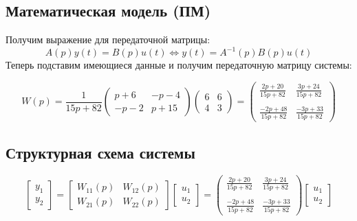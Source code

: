 \documentclass[a5paper, 10pt]{article}
\theoremstyle{definition}
\theoremstyle{plain}
\theoremstyle{remark}
\begin{document}
\subsection{Математическая модель (ПМ)}
Получим выражение для передаточной матрицы:
\begin{equation*}
A(p)y(t)=B(p)u(t) \Leftrightarrow y(t) = A^{-1}(p) B(p)u(t)
\end{equation*}
Теперь подставим имеющиеся данные и получим передаточную матрицу системы:

\begin{equation*}
W(p) = 
\frac{1}{15p+82}
\begin{pmatrix}
p+6 &-p-4\\
-p-2 & p+15
\end{pmatrix}
\begin{pmatrix}
6 &6\\
4 & 3
\end{pmatrix}
=
\begin{pmatrix}
\frac{2p+20}{15p+82} & \frac{3p+24}{15p+82}\\\\
\frac{-2p+48}{15p+82} & \frac{-3p+33}{15p+82}
\end{pmatrix}
\end{equation*}


\subsection{Структурная схема системы}
\begin{equation*}
\begin{bmatrix}
y_1\\
y_2
\end{bmatrix}
=
\begin{bmatrix}
W_{11}(p) & W_{12}(p)\\
W_{21}(p) & W_{22}(p)
\end{bmatrix}
\begin{bmatrix}
u_1\\
u_2
\end{bmatrix}
=
\begin{pmatrix}
\frac{2p+20}{15p+82} & \frac{3p+24}{15p+82}\\\\
\frac{-2p+48}{15p+82} & \frac{-3p+33}{15p+82}
\end{pmatrix}
\begin{bmatrix}
u_1\\
u_2
\end{bmatrix}
\end{equation*}
\end{document}

